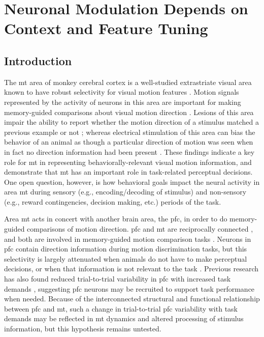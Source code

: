
\chapter{\color{RoyalBlue!50!black} Neuronal Modulation Depends on Context and Feature Tuning} %

\label{ch:papernak} %


\section*{Introduction}
The \gls{mt} area of monkey cerebral cortex is a well-studied extrastriate visual area known to have robust selectivity for visual motion features \parencite{Britten1992, Born2005, Pasternak2020}. Motion signals represented by the activity of neurons in this area are important for making memory-guided comparisons about visual motion direction \parencite{Lui2011, Wimmer2016, Katz2016}. Lesions of this area impair the ability to report whether the motion direction of a stimulus matched a previous example or not \parencite{Rudolph1999a, Bisley2000a}; whereas electrical stimulation of this area can bias the behavior of an animal as though a particular direction of motion was seen when in fact no direction information had been present \parencite{ Bisley2001, Salzman1992, Salzman1990}. These findings indicate a key role for \gls{mt} in representing behaviorally-relevant visual motion information, and demonstrate that \gls{mt} has an important role in task-related perceptual decisions. One open question, however, is how behavioral goals impact the neural activity in area \gls{mt} during sensory (e.g., encoding/decoding of stimulus) and non-sensory (e.g., reward contingencies, decision making, etc.) periods of the task.

Area \gls{mt} acts in concert with another brain area, the \gls{pfc}, in order to do memory-guided comparisons of motion direction. \Gls{pfc} and \gls{mt} are reciprocally connected \parencite{Ungerleider1986, Barbas1988, Petrides2006}, and both are involved in memory-guided motion comparison tasks \parencite{Zaksas2006}. Neurons in \gls{pfc} contain direction information during motion discrimination tasks, but this selectivity is largely attenuated when animals do not have to make perceptual decisions, or when that information is not relevant to the task \parencite{Hussar2009, Hussar2012, Hussar2013}. Previous research has also found reduced trial-to-trial variability in \gls{pfc} with increased task demands \parencite{Hussar2010}, suggesting \gls{pfc} neurons may be recruited to support task performance when needed. Because of the interconnected structural and functional relationship between \gls{pfc} and \gls{mt}, such a change in trial-to-trial \gls{pfc} variability with task demands may be reflected in \gls{mt} dynamics and altered processing of stimulus information, but this hypothesis remains untested.

